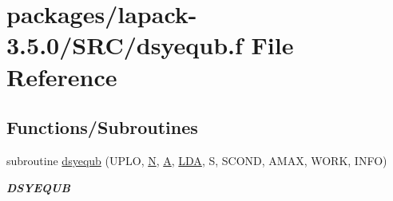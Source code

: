 \hypertarget{dsyequb_8f}{}\section{packages/lapack-\/3.5.0/\+S\+R\+C/dsyequb.f File Reference}
\label{dsyequb_8f}
\subsection*{Functions/\+Subroutines}
\begin{DoxyCompactItemize}
\item 
subroutine \hyperlink{group__doubleSYcomputational_ga9918f2fce465d784f2afea2aad1293f0}{dsyequb} (U\+P\+L\+O, \hyperlink{polmisc_8c_a0240ac851181b84ac374872dc5434ee4}{N}, \hyperlink{classA}{A}, \hyperlink{example__user_8c_ae946da542ce0db94dced19b2ecefd1aa}{L\+D\+A}, S, S\+C\+O\+N\+D, A\+M\+A\+X, W\+O\+R\+K, I\+N\+F\+O)
\begin{DoxyCompactList}\small\item\em {\bfseries D\+S\+Y\+E\+Q\+U\+B} \end{DoxyCompactList}\end{DoxyCompactItemize}
